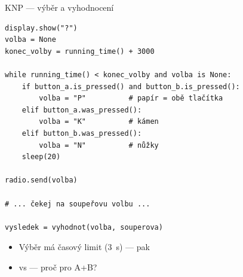 \begin{frame}[fragile]{KNP — výběr a vyhodnocení}

\begin{lstlisting}[basicstyle=\small\ttfamily]
display.show("?")
volba = None
konec_volby = running_time() + 3000

while running_time() < konec_volby and volba is None:
    if button_a.is_pressed() and button_b.is_pressed():
        volba = "P"          # papír = obě tlačítka
    elif button_a.was_pressed():
        volba = "K"          # kámen
    elif button_b.was_pressed():
        volba = "N"          # nůžky
    sleep(20)

radio.send(volba)

# ... čekej na soupeřovu volbu ...

vysledek = vyhodnot(volba, souperova)
\end{lstlisting}

  \begin{itemize}
    \item Výběr má časový limit (3~s) — pak 
    \item {} vs  — proč 
          pro A+B?
  \end{itemize}

\end{frame}


